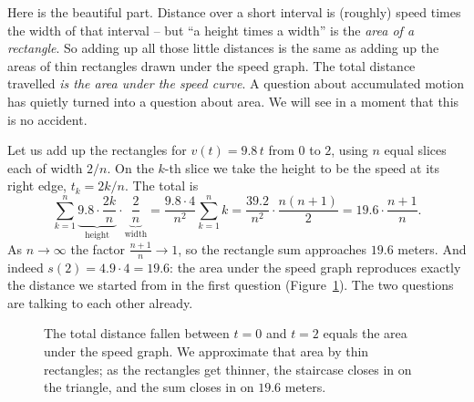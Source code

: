Here is the beautiful part. Distance over a short interval is (roughly) speed
times the width of that interval -- but ``a height times a width'' is the
\emph{area of a rectangle}. So adding up all those little distances is the same
as adding up the areas of thin rectangles drawn under the speed graph. The total
distance travelled \emph{is the area under the speed curve}. A question about
accumulated motion has quietly turned into a question about area. We will see in
a moment that this is no accident.

Let us add up the rectangles for $v(t) = 9.8\,t$ from $0$ to $2$, using $n$
equal slices each of width $2/n$. On the $k$-th slice we take the height to be
the speed at its right edge, $t_k = 2k/n$. The total is
\[
  \sum_{k=1}^{n} \underbrace{9.8 \cdot \frac{2k}{n}}_{\text{height}}
  \cdot \underbrace{\frac{2}{n}}_{\text{width}}
  = \frac{9.8 \cdot 4}{n^2}\sum_{k=1}^{n} k
  = \frac{39.2}{n^2}\cdot\frac{n(n+1)}{2}
  = 19.6\cdot\frac{n+1}{n}.
\]
As $n \to \infty$ the factor $\tfrac{n+1}{n}\to 1$, so the rectangle sum
approaches $19.6$ meters. And indeed $s(2) = 4.9\cdot 4 = 19.6$: the area under
the speed graph reproduces exactly the distance we started from in the first
question (Figure~\ref{ch01:fig-rectangles}). The two questions are talking to each
other already.

\begin{figure}[H]
\centering
{}
\caption{The total distance fallen between $t=0$ and $t=2$ equals the area under
the speed graph. We approximate that area by thin rectangles; as the rectangles
get thinner, the staircase closes in on the triangle, and the sum closes in on
$19.6$ meters.}
\label{ch01:fig-rectangles}
\end{figure}

